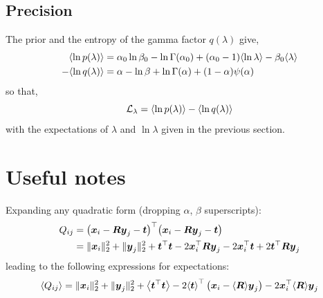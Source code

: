 \documentclass{article}
\newcommand{\lh}{\mathopen{}\mathclose\bgroup\left}
\newcommand{\rh}{\aftergroup\egroup\right}
\newcommand{\E}[1]{\lh\langle #1 \rh\rangle}
\newcommand{\m}[1]{\boldsymbol{#1}}
\begin{document}
\subsection{Precision}
The prior and the entropy of the gamma factor $q(\lambda)$ give,
\begin{equation}
\begin{aligned}
\E{\ln p(\lambda)} &=
 \alpha_0 \ln \beta_0 - \ln \Gamma(\alpha_0)
 +(\alpha_0 - 1) \E{\ln \lambda}
 -\beta_0 \E{\lambda}
\\
-\E{\ln q(\lambda)} &=
 \alpha - \ln \beta + \ln \Gamma(\alpha)
 +(1 - \alpha) \psi(\alpha)
\end{aligned}
\end{equation}
so that,
\begin{equation}
\mathcal{L}_{\lambda} =
 \E{\ln p(\lambda)} - \E{\ln q(\lambda)}
\end{equation}
with the expectations of $\lambda$ and $\ln \lambda$
given in the previous section.

\clearpage
\appendix
\section*{Useful notes}
Expanding any quadratic form (dropping $\alpha$, $\beta$ superscripts):
\begin{equation}
\begin{aligned}
Q_{ij} &=
 \lh( \m{x}_i - \m{R} \m{y}_j - \m{t} \rh)^\top
 \lh( \m{x}_i - \m{R} \m{y}_j - \m{t} \rh)
\\ &=
   \| \m{x}_i \|_2^2
 + \| \m{y}_j \|_2^2
 + \m{t}^\top \m{t}
 - 2 \m{x}_i^\top \m{R} \m{y}_j
 - 2 \m{x}_i^\top \m{t}
 + 2 \m{t}^\top \m{R} \m{y}_j
\end{aligned}
\end{equation}
leading to the following expressions for expectations:
\begin{equation}
\E{Q_{ij}} =
   \| \m{x}_i \|_2^2
 + \| \m{y}_j \|_2^2
 + \E{\m{t}^\top \m{t}}
 - 2 \E{\m{t}}^\top \left( \m{x}_i - \E{\m{R}} \m{y}_j \right)
 - 2 \m{x}_i^\top \E{\m{R}} \m{y}_j
\end{equation}

\end{document}
